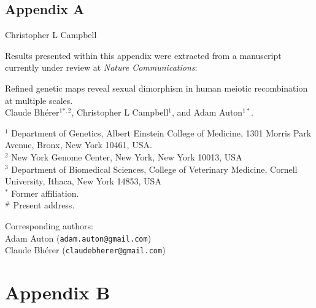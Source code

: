\documentclass[11pt,twoside,openright,letterpaper]{memoir}
\begin{document}
\begin{SingleSpace}
\renewcommand{\thechapter}{A}
\chapter{Appendix A} \label{ch:appendixCB}


\vspace{0.5cm}
Christopher L Campbell

\vspace{0.5cm}
\noindent Results presented within this appendix were extracted from a manuscript currently under review at \textit{Nature Communications}:

\vspace{0.5cm}
\noindent Refined genetic maps reveal sexual dimorphism in human meiotic recombination at multiple scales. \\

\noindent Claude Bh\'{e}rer$^{1*,2}$, Christopher L Campbell$^1$, and Adam Auton$^{1*}$.

\vspace{0.5cm}
\noindent $^1$ Department of Genetics, Albert Einstein College of Medicine, 1301 Morris Park Avenue, Bronx, New York 10461, USA. \\
\noindent $^2$ New York Genome Center, New York, New York 10013, USA \\
\noindent $^3$ Department of Biomedical Sciences, College of Veterinary Medicine, Cornell University, Ithaca, New York 14853, USA \\
\noindent $^*$ Former affiliation. \\
\noindent $^\#$ Present address.

\vspace{0.5cm}
\begin{centering}
    Corresponding authors: \\
    Adam Auton (\texttt{adam.auton@gmail.com}) \\
    Claude Bh\'{e}rer (\texttt{claudebherer@gmail.com}) \\
\end{centering}
\end{SingleSpace}


%
%

\chapter{Appendix B}
%
%
%


\end{document}
